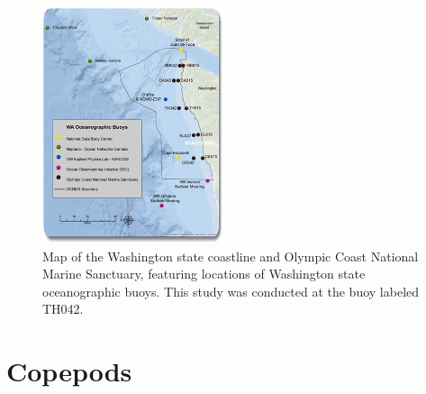 \documentclass[12pt,twoside]{reedthesis}
\begin{document}
\begin{figure}
\begin{center}
		\includegraphics[width=0.48\textwidth]{Fig_OCNMS_buoy_map}
		\caption[Map of oceanographic moorings in OCNMS]{\footnotesize{Map of the Washington state coastline and Olympic Coast National Marine Sanctuary, featuring locations of Washington state oceanographic buoys. This study was conducted at the buoy labeled TH042. }} %
		\label{OCNMSbuoys}
	\end{center}
\end{figure} 


\section{Copepods}
\end{document}
